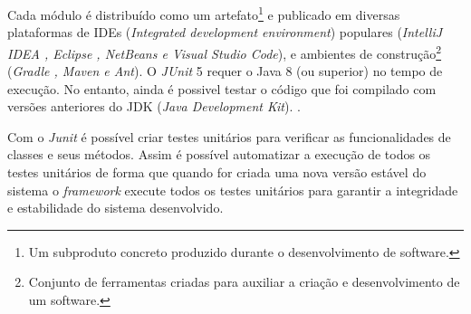 Cada módulo é distribuído como um artefato\footnote{Um subproduto concreto produzido durante o desenvolvimento de software.} e publicado em diversas plataformas de IDEs (\textit{Integrated development environment}) populares (\textit{IntelliJ IDEA , Eclipse , NetBeans e Visual Studio Code}), e ambientes de construção\footnote{Conjunto de ferramentas criadas para auxiliar a criação e desenvolvimento de um software.} (\textit{Gradle , Maven e Ant}). O \textit{JUnit} 5 requer o Java 8 (ou superior) no tempo de execução. No entanto, ainda é possivel testar o código que foi compilado com versões anteriores do JDK (\textit{Java Development Kit}). \cite{Junit}.


Com o \textit{Junit} é possível criar testes unitários para verificar as funcionalidades de classes e seus métodos. Assim é possível automatizar a execução de todos os testes unitários de forma que quando for criada uma nova versão estável do sistema o \textit{framework} execute todos os testes unitários para garantir a integridade e estabilidade do sistema desenvolvido.






  

